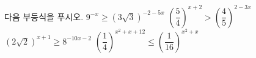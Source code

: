 다음 부등식을 푸시오.
 $9^{-x}\ge(3\sqrt{3})^{-2-5x}$
 $\left(\dfrac{5}{4}\right)^{x+2}>\left(\dfrac{4}{5}\right)^{2-3x}$
 $(2\sqrt{2})^{x+1}\ge 8^{-10x-2}$
 $\left(\dfrac{1}{4}\right)^{x^{2}+x+12}\le\left(\dfrac{1}{16}\right)^{x^{2}+x}$
